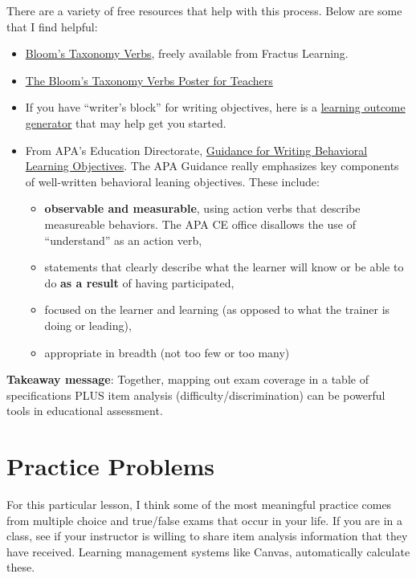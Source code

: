 \documentclass[
  english,
]{book}
\providecommand{\tightlist}{%
  \setlength{\itemsep}{0pt}\setlength{\parskip}{0pt}}
\begin{document}
There are a variety of free resources that help with this process. Below are some that I find helpful:

\begin{itemize}
\tightlist
\item
  \href{https://www.fractuslearning.com/blooms-taxonomy-verbs-free-chart/}{Bloom's Taxonomy Verbs}, freely available from Fractus Learning.
\item
  \href{https://wabisabilearning.com/blogs/literacy-numeracy/download-blooms-digital-taxonomy-verbs-poster}{The Bloom's Taxonomy Verbs Poster for Teachers}
\item
  If you have ``writer's block'' for writing objectives, here is a \href{https://elearn.sitehost.iu.edu/courses/tos/gen2/}{learning outcome generator} that may help get you started.
\item
  From APA's Education Directorate, \href{https://www.apa.org/ed/sponsor/resources/objectives.pdf}{Guidance for Writing Behavioral Learning Objectives}. The APA Guidance really emphasizes key components of well-written behavioral leaning objectives. These include:

  \begin{itemize}
  \tightlist
  \item
    \textbf{observable and measurable}, using action verbs that describe measureable behaviors. The APA CE office disallows the use of ``understand'' as an action verb,
  \item
    statements that clearly describe what the learner will know or be able to do \textbf{as a result} of having participated,
  \item
    focused on the learner and learning (as opposed to what the trainer is doing or leading),
  \item
    appropriate in breadth (not too few or too many)
  \end{itemize}
\end{itemize}

\textbf{Takeaway message}: Together, mapping out exam coverage in a table of specifications PLUS item analysis (difficulty/discrimination) can be powerful tools in educational assessment.

\hypertarget{practice-problems-4}{%
\section{Practice Problems}\label{practice-problems-4}}

For this particular lesson, I think some of the most meaningful practice comes from multiple choice and true/false exams that occur in your life. If you are in a class, see if your instructor is willing to share item analysis information that they have received. Learning management systems like Canvas, automatically calculate these.
\end{document}
